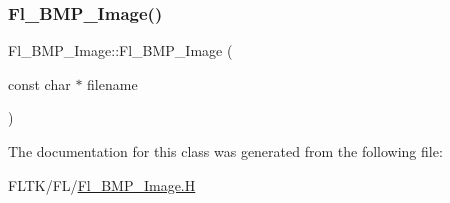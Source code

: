 \subsubsection{\texorpdfstring{Fl\+\_\+\+B\+M\+P\+\_\+\+Image()}{Fl\_BMP\_Image()}}
{\footnotesize\ttfamily Fl\+\_\+\+B\+M\+P\+\_\+\+Image\+::\+Fl\+\_\+\+B\+M\+P\+\_\+\+Image (\begin{DoxyParamCaption}\item[{const char $\ast$}]{filename }\end{DoxyParamCaption})}



The documentation for this class was generated from the following file\+:\begin{DoxyCompactItemize}
\item 
F\+L\+T\+K/\+F\+L/\hyperlink{_fl___b_m_p___image_8_h}{Fl\+\_\+\+B\+M\+P\+\_\+\+Image.\+H}\end{DoxyCompactItemize}
